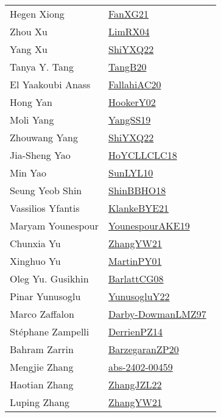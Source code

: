 {\begin{longtable}{p{4cm}p{20cm}}
Hegen Xiong & \href{articles/FanXG21.pdf}{FanXG21}~\cite{FanXG21}\\
Zhou Xu & \href{papers/LimRX04.pdf}{LimRX04}~\cite{LimRX04}\\
Yang Xu & \href{}{ShiYXQ22}~\cite{ShiYXQ22}\\
Tanya Y. Tang & \href{papers/TangB20.pdf}{TangB20}~\cite{TangB20}\\
El Yaakoubi Anass & \href{}{FallahiAC20}~\cite{FallahiAC20}\\
Hong Yan & \href{papers/HookerY02.pdf}{HookerY02}~\cite{HookerY02}\\
Moli Yang & \href{papers/YangSS19.pdf}{YangSS19}~\cite{YangSS19}\\
Zhouwang Yang & \href{}{ShiYXQ22}~\cite{ShiYXQ22}\\
Jia{-}Sheng Yao & \href{papers/HoYCLLCLC18.pdf}{HoYCLLCLC18}~\cite{HoYCLLCLC18}\\
Min Yao & \href{papers/SunLYL10.pdf}{SunLYL10}~\cite{SunLYL10}\\
Seung Yeob Shin & \href{articles/ShinBBHO18.pdf}{ShinBBHO18}~\cite{ShinBBHO18}\\
Vassilios Yfantis & \href{papers/KlankeBYE21.pdf}{KlankeBYE21}~\cite{KlankeBYE21}\\
Maryam Younespour & \href{}{YounespourAKE19}~\cite{YounespourAKE19}\\
Chunxia Yu & \href{articles/ZhangYW21.pdf}{ZhangYW21}~\cite{ZhangYW21}\\
Xinghuo Yu & \href{articles/MartinPY01.pdf}{MartinPY01}~\cite{MartinPY01}\\
Oleg Yu. Gusikhin & \href{papers/BarlattCG08.pdf}{BarlattCG08}~\cite{BarlattCG08}\\
Pinar Yunusoglu & \href{}{YunusogluY22}~\cite{YunusogluY22}\\
Marco Zaffalon & \href{articles/Darby-DowmanLMZ97.pdf}{Darby-DowmanLMZ97}~\cite{Darby-DowmanLMZ97}\\
St{\'{e}}phane Zampelli & \href{papers/DerrienPZ14.pdf}{DerrienPZ14}~\cite{DerrienPZ14}\\
Bahram Zarrin & \href{papers/BarzegaranZP20.pdf}{BarzegaranZP20}~\cite{BarzegaranZP20}\\
Mengjie Zhang & \href{articles/abs-2402-00459.pdf}{abs-2402-00459}~\cite{abs-2402-00459}\\
Haotian Zhang & \href{papers/ZhangJZL22.pdf}{ZhangJZL22}~\cite{ZhangJZL22}\\
Luping Zhang & \href{articles/ZhangYW21.pdf}{ZhangYW21}~\cite{ZhangYW21}\\

\end{longtable}}
